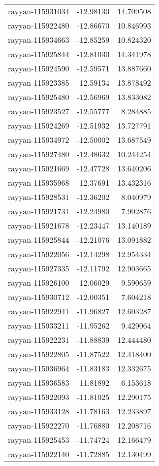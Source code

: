 \documentclass[
]{article}
\begin{document}
\begin{longtable}[]{@{}lrr@{}}
rayyan-115931034 & -12.98130 & 14.709508 \\
rayyan-115922480 & -12.86670 & 10.846993 \\
rayyan-115934663 & -12.85259 & 10.824320 \\
rayyan-115925844 & -12.81030 & 14.341978 \\
rayyan-115924590 & -12.59571 & 13.887660 \\
rayyan-115923385 & -12.59134 & 13.878492 \\
rayyan-115925480 & -12.56969 & 13.833082 \\
rayyan-115923527 & -12.55777 & 8.284885 \\
rayyan-115924269 & -12.51932 & 13.727791 \\
rayyan-115934972 & -12.50002 & 13.687549 \\
rayyan-115927480 & -12.48632 & 10.244254 \\
rayyan-115921669 & -12.47728 & 13.640206 \\
rayyan-115935968 & -12.37691 & 13.432316 \\
rayyan-115928531 & -12.36202 & 8.040979 \\
rayyan-115921731 & -12.24980 & 7.902876 \\
rayyan-115921678 & -12.23447 & 13.140189 \\
rayyan-115925844 & -12.21076 & 13.091882 \\
rayyan-115922056 & -12.14298 & 12.954334 \\
rayyan-115927335 & -12.11792 & 12.903665 \\
rayyan-115926100 & -12.06029 & 9.590659 \\
rayyan-115930712 & -12.00351 & 7.604218 \\
rayyan-115922941 & -11.96827 & 12.603287 \\
rayyan-115933211 & -11.95262 & 9.429064 \\
rayyan-115922231 & -11.88839 & 12.444480 \\
rayyan-115922805 & -11.87522 & 12.418400 \\
rayyan-115936964 & -11.83183 & 12.332675 \\
rayyan-115936583 & -11.81892 & 6.153618 \\
rayyan-115922093 & -11.81025 & 12.290175 \\
rayyan-115933128 & -11.78163 & 12.233897 \\
rayyan-115922270 & -11.76880 & 12.208716 \\
rayyan-115925453 & -11.74724 & 12.166479 \\
rayyan-115922140 & -11.72885 & 12.130499 \\

\end{longtable}
\end{document}
